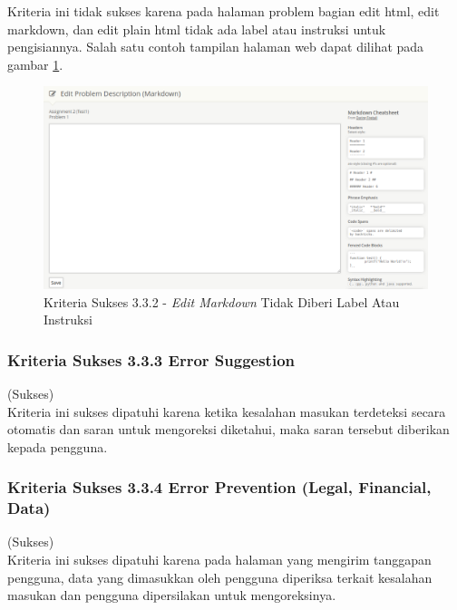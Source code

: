 \documentclass[a4paper,twoside]{article}
\begin{document}
\begin{enumerate}
		Kriteria ini tidak sukses karena pada halaman problem bagian edit html, edit markdown, dan edit plain html tidak ada label atau instruksi untuk pengisiannya. Salah satu contoh tampilan halaman web dapat dilihat pada gambar \ref{fig:kepatuhan_3_3_2_edit_markdown}.
		\begin{figure}[H]
			\centering  
			\includegraphics[scale=0.25]{kepatuhan_3_3_2_edit_markdown}  
			\caption[Kriteria Sukses 3.3.2 - \textit{Edit Markdown} Tidak Diberi Label Atau Instruksi]{Kriteria Sukses 3.3.2 - \textit{Edit Markdown} Tidak Diberi Label Atau Instruksi} 
			\label{fig:kepatuhan_3_3_2_edit_markdown} 
		\end{figure}
		
		\subsubsection*{Kriteria Sukses 3.3.3 Error Suggestion}
		\label{subsubsec:kepatuhan_kriteria_3.3.3}
		(Sukses) \\
		
		Kriteria ini sukses dipatuhi karena ketika kesalahan masukan terdeteksi secara otomatis dan saran untuk mengoreksi diketahui, maka saran tersebut diberikan kepada pengguna.
		
		\subsubsection*{Kriteria Sukses 3.3.4 Error Prevention (Legal, Financial, Data)}
		\label{subsubsec:kepatuhan_kriteria_3.3.4}
		(Sukses) \\
		
		Kriteria ini sukses dipatuhi karena pada halaman yang mengirim tanggapan pengguna, data yang dimasukkan oleh pengguna diperiksa terkait kesalahan masukan dan pengguna dipersilakan untuk mengoreksinya.
		

\end{enumerate}
\end{document}
